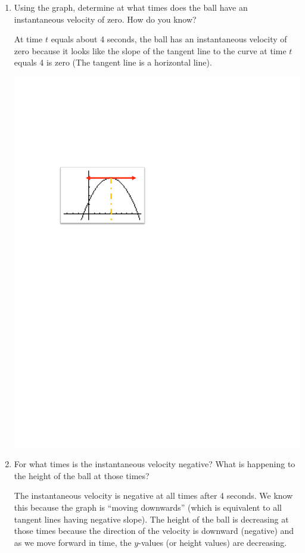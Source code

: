 \documentclass[handout,nooutcomes]{ximera}
\begin{document}
\begin{problem}
\begin{enumerate}
		\item  Using the graph, determine at what times does the ball have an instantaneous velocity of zero.  How do you know?\begin{freeResponse}		 
		At time $t$ equals about 4 seconds, the ball has an instantaneous velocity of zero because it looks like the slope of the tangent line to the curve at time $t$ equals 4 is zero (The tangent line is a horizontal line).
			\begin{image}
			\includegraphics[trim= 80 470 300 180]{Figure7.pdf}
			\end{image}
		\end{freeResponse}
		
		
		
		
		\item  For what times is the instantaneous velocity negative?  What is happening to the height of the ball at those times?
		\begin{freeResponse}		 
		The instantaneous velocity is negative at all times after 4 seconds.  We know this because the graph is ``moving downwards'' (which is equivalent to all tangent lines having negative slope).  The height of the ball is decreasing at those times because the direction of the velocity is downward (negative) and as we move forward in time, the $y$-values (or height values) are decreasing. 
		\end{freeResponse}
			
		\end{enumerate}
			
\end{problem}
			
\end{document}
